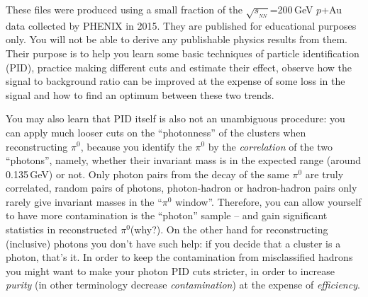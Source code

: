 \documentclass[pdftex,12pt,letter]{article}
\newcommand{\sqsn}{\mbox{$\sqrt{s_{_{NN}}}$}\xspace}
\newcommand{\piz}{\mbox{$\pi^0$}\xspace}
\newcommand{\gev}{\mbox{GeV}\xspace}
\begin{document}
These files were produced
using a small fraction of the \sqsn=200\,GeV $p$+Au data collected by
PHENIX in 2015.  They are published for educational purposes only.
You will not be able to derive any publishable physics results from
them. Their purpose is to help you learn some basic techniques of
particle identification (PID), practice making different cuts and
estimate their effect, observe how the signal to background ratio
can be improved at the expense of some loss in the signal and
how to find an optimum between these two trends. 

You may also learn that PID itself is
also not an unambiguous procedure: you can apply much looser cuts on
the ``photonness'' of the clusters when reconstructing \piz, because
you identify the \piz by the {\it correlation} of the two ``photons'',
namely, whether their invariant mass is in the expected range (around
0.135\,\gev) or not.  Only photon pairs from the decay of the same
\piz are truly correlated, random pairs of photons, photon-hadron or
hadron-hadron pairs only rarely give invariant masses in the 
``\piz window''.  Therefore, you can allow yourself to have more
contamination is the ``photon'' sample -- and gain significant
statistics in reconstructed \piz (why?).  On the other hand for
reconstructing (inclusive) photons you don't have such help: if you
decide that a cluster is a photon, that's it.  In order to keep the
contamination from misclassified hadrons you might want to make your
photon PID cuts stricter, in order to increase {\it purity} 
(in other terminology decrease {\it contamination}) at the
expense of {\it efficiency}.
\end{document}
